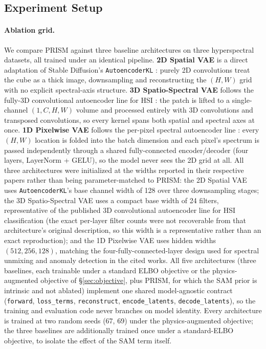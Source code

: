 \documentclass{article} %
\begin{document}
\subsection{Experiment Setup}
\label{sec:datasets}

\paragraph{Ablation grid.} We compare PRISM against three baseline architectures on three hyperspectral datasets, all trained under an identical pipeline. \textbf{2D Spatial VAE} is a direct adaptation of Stable Diffusion's \texttt{AutoencoderKL} \citep{rombach2022ldm}: purely 2D convolutions treat the cube as a thick image, downsampling and reconstructing the $(H,W)$ grid with no explicit spectral-axis structure. \textbf{3D Spatio-Spectral VAE} follows the fully-3D convolutional autoencoder line for HSI \citep{chen2016deep}: the patch is lifted to a single-channel $(1, C, H, W)$ volume and processed entirely with 3D convolutions and transposed convolutions, so every kernel spans both spatial and spectral axes at once. \textbf{1D Pixelwise VAE} follows the per-pixel spectral autoencoder line \citep{palsson2018unmixing, liu2022dualfreq}: every $(H,W)$ location is folded into the batch dimension and each pixel's spectrum is passed independently through a shared fully-connected encoder/decoder (four layers, LayerNorm + GELU), so the model never sees the 2D grid at all. All three architectures were initialized at the widths reported in their respective papers rather than being parameter-matched to PRISM: the 2D Spatial VAE uses \texttt{AutoencoderKL}'s base channel width of 128 over three downsampling stages; the 3D Spatio-Spectral VAE uses a compact base width of 24 filters, representative of the published 3D convolutional autoencoder line for HSI classification (the exact per-layer filter counts were not recoverable from that architecture's original description, so this width is a representative rather than an exact reproduction); and the 1D Pixelwise VAE uses hidden widths $(512, 256, 128)$, matching the four-fully-connected-layer design used for spectral unmixing and anomaly detection in the cited works. All five architectures (three baselines, each trainable under a standard ELBO objective or the physics-augmented objective of \S\ref{sec:objective}, plus PRISM, for which the SAM prior is intrinsic and not ablated) implement one shared model-agnostic contract (\texttt{forward}, \texttt{loss\_terms}, \texttt{reconstruct}, \texttt{encode\_latents}, \texttt{decode\_latents}), so the training and evaluation code never branches on model identity. Every architecture is trained at two random seeds (67, 69) under the physics-augmented objective; the three baselines are additionally trained once under a standard-ELBO objective, to isolate the effect of the SAM term itself.
\end{document}
